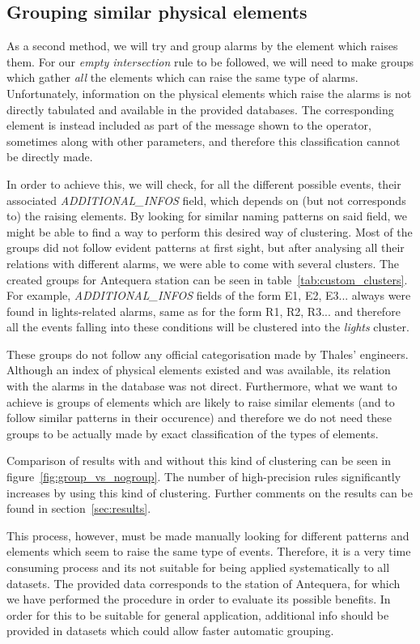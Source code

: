 \documentclass[a4paper,12pt]{article}
\begin{document}
\subsection{Grouping similar physical elements}
\label{sec:group_elements}
As a second method, we will try and group alarms by the element which raises them. For our \emph{empty intersection} rule to be followed, we will need to make groups which gather \emph{all} the elements which can raise the same type of alarms. Unfortunately, information on the physical elements which raise the alarms is not directly tabulated and available in the provided databases. The corresponding element is instead included as part of the message shown to the operator, sometimes along with other parameters, and therefore this classification cannot be directly made.

In order to achieve this, we will check, for all the different possible events, their associated \emph{ADDITIONAL\_INFOS} field, which depends on (but not corresponds to) the raising elements. By looking for similar naming patterns on said field, we might be able to find a way to perform this desired way of clustering. Most of the groups did not follow evident patterns at first sight, but after analysing all their relations with different alarms, we were able to come with several clusters. The created groups for Antequera station can be seen in table~\ref{tab:custom_clusters}. For example, \emph{ADDITIONAL\_INFOS} fields of the form E1, E2, E3... always were found in lights-related alarms, same as for the form R1, R2, R3... and therefore all the events falling into these conditions will be clustered into the \emph{lights} cluster.

These groups do not follow any official categorisation made by Thales' engineers. Although an index of physical elements existed and was available, its relation with the alarms in the database was not direct. Furthermore, what we want to achieve is groups of elements which are likely to raise similar elements (and to follow similar patterns in their occurence) and therefore we do not need these groups to be actually made by exact classification of the types of elements.

Comparison of results with and without this kind of clustering can be seen in figure~\ref{fig:group_vs_nogroup}. The number of high-precision rules significantly increases by using this kind of clustering. Further comments on the results can be found in section~\ref{sec:results}.

This process, however, must be made manually looking for different patterns and elements which seem to raise the same type of events. Therefore, it is a very time consuming process and its not suitable for being applied systematically to all datasets. The provided data corresponds to the station of Antequera, for which we have performed the procedure in order to evaluate its possible benefits. In order for this to be suitable for general application, additional info should be provided in datasets which could allow faster automatic grouping.
\end{document}
